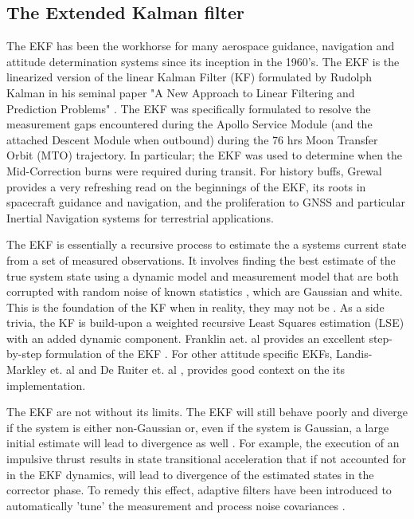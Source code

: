\subsection{The Extended Kalman filter}\label{CHAP1_3_1}
The EKF has been the workhorse for many aerospace guidance, navigation and attitude determination systems since its inception in the 1960's. The EKF is the linearized version of the linear Kalman Filter (KF) formulated by Rudolph Kalman in his seminal paper "A New Approach to Linear Filtering and Prediction Problems" \cite{Klmn1960ANA}. The EKF was specifically formulated to resolve the measurement gaps encountered during the Apollo Service Module (and the attached Descent Module when outbound) during the 76 hrs Moon Transfer Orbit (MTO) trajectory. In particular; the EKF was used to determine when the Mid-Correction burns were required during transit. For history buffs, Grewal \cite{grewalKFHistory10} provides a very refreshing read on the beginnings of the EKF, its roots in spacecraft guidance and navigation, and the proliferation to GNSS and particular Inertial Navigation systems for terrestrial applications.  

The EKF is essentially a recursive process to estimate the a systems current state  from a set of measured observations. It involves finding the best estimate of the true system state using a dynamic model and measurement model that are both corrupted with random noise of known statistics \cite{landisMarkleyFundamentalsOfADCSSpacecraft15}, which are Gaussian and white. This is the foundation of the KF when in reality, they may not be \cite{franklinDigitalControl97}. As a side trivia, the KF is build-upon a weighted recursive Least Squares estimation (LSE) with an added dynamic component. Franklin aet. al provides an excellent step-by-step formulation of the EKF \cite{franklinDigitalControl97}. For other attitude specific EKFs, Landis-Markley et. al \cite{landisMarkleyFundamentalsOfADCSSpacecraft15} and De Ruiter et. al \cite{deRuiter2012spacecraft}, provides good context on the its implementation. 
 
The EKF are not without its limits. The EKF will still behave poorly and diverge if the system is either non-Gaussian or, even if the system is Gaussian, a large initial estimate will lead to divergence as well \cite{franklinDigitalControl97}. For example, the execution of an impulsive thrust results in state transitional acceleration that if not accounted for in the EKF dynamics, will lead to divergence of the estimated states in the corrector phase. To remedy this effect, adaptive filters have been introduced to automatically 'tune' the measurement and process noise covariances \cite{frasierAdaptiveKF18, woffidenRez07}. 

